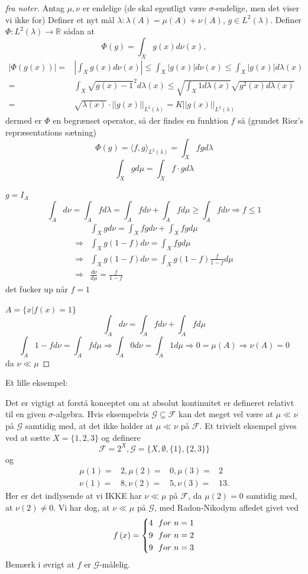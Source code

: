 \documentclass[12pt]{report}
\theoremstyle{break}
\newtheorem*{proof}{Bevis}
\theoremstyle{break}
\newcommand{\RR}{\mathbb{R}}
\newcommand{\G}{\mathcal{G}}
\newcommand{\FI}{\mathcal{F}}
\begin{document}
\begin{proof}[fra noter]
	 Antag $\mu,\nu$ er endelige (de skal egentligt være $\sigma$-endelige, men det viser vi ikke for)
	 Definer et nyt mål $\lambda\colon\lambda(A) = \mu(A)+\nu(A)$,  $g\in L^2(\lambda)$.
	 Definer $\Phi \colon L^2(\lambda) \to \RR$ sådan at
	\[ \Phi(g)=\int_Xg(x)d\nu(x), \]
	\begin{align*}
		|\Phi(g(x))|=&\left\vert \int_X g(x)d\nu(x)\right\vert \leq \int_X |g(x)|d\nu(x) \leq \int_X |g(x)|d\lambda(x)\\
		=&\int_X \sqrt{g(x)-1}^2d\lambda(x)\leq \sqrt{\int_X 1 d\lambda(x)}\sqrt{g^2(x)d\lambda(x)}\\
		=&\sqrt{\lambda(x)}\cdot ||g(x)||_{L^2(\lambda)}=K||g(x)||_{L^2(\lambda)}
	\end{align*}
	dermed er $\Phi$ en begrænset operator, så der findes en funktion $f$ så (grundet Riez's repræsentations sætning)
	\[ \Phi(g)= \langle f,g \rangle_{L^2(\lambda)}=\int_X fgd\lambda \]
	\[ \int_Xgd\mu=\int_X f\cdot g d\lambda \]
	
	
	$g=I_A$
	\[\int_A d\nu=\int_A fd\lambda = \int_A fd\nu+\int_A fd\mu \geq \int_A f d\nu \Rightarrow f\leq 1\]
	\begin{align*}
		&\int_X g d \nu=\int_Xfgd\nu+\int_Xfgd\mu\\
		\Rightarrow&\int_X g(1-f)d\nu=\int_Xfgd\mu\\
		\Rightarrow&\int_Xg(1-f)d\nu=\int_Xg(1-f)\frac{f}{1-f}d\mu\\
		\Rightarrow&\frac{d\nu}{d\mu}=\frac{f}{1-f}
	\end{align*}
	det fucker up når $f=1$
	
	$A=\{ x |f(x)=1 \}$
	\[ \int_A d\nu =\int_A f d \nu +\int_A fd\mu \]
	\[ \int_A 1-f d\nu=\int_A fd \mu \Rightarrow\int_A 0 d\nu = \int_A 1d\mu \Rightarrow0=\mu(A)\Rightarrow\nu(A)=0 \]
	da $\nu\ll\mu$
\end{proof}
Et lille eksempel:

	Det er vigtigt at forstå konceptet om at absolut kontinuitet er defineret relativt til en given $\sigma$-algebra. Hvis eksempelvis $\G \subseteq\FI$ kan det meget vel være at $\mu\ll\nu$ på $\G$ samtidig med, at det ikke holder at $\mu\ll\nu$ på $\FI$. Et trivielt eksempel gives ved at sætte $X=\{1,2,3\} $ og definere
	\[ \FI=2^X, \G=\{X,\emptyset,\{1\},\{2,3\}\} \]
	og
	\begin{align*}
		\mu(1)=&2, \mu(2)=&0, \mu(3)=&2\\
		\nu(1)=&8, \nu(2)=&5, \nu(3)=&13. 
	\end{align*}
	Her er det indlysende at vi IKKE har $\nu\ll\mu$ på $\FI$, da $\mu(2)=0$ samtidig med, at $\nu(2)\neq 0$. Vi har dog, at $\nu\ll\mu$ på $\G$, med Radon-Nikodym afledet givet ved
	\[f\left( x \right) = \left\{ \begin{gathered}
	4\hfill ~~for\,\, n=1 \\
	9\hfill ~~for\,\, n=2 \\
	9\hfill ~~for\,\, n=3 
	\end{gathered}  \right.\]
Bemærk i øvrigt at $f$ er $\G$-målelig.
\end{document}
